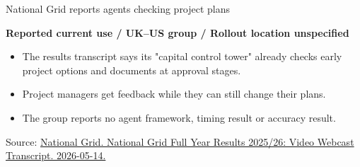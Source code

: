 \begin{frame}[t]{National Grid reports agents checking project plans}
\relax
{\scriptsize\color{Slate}\textbf{Reported current use / UK--US group / Rollout location unspecified}\par}\smallskip
{
\normalsize\begin{itemize}
\item The results transcript says its "capital control tower" already checks early project options and documents at approval stages.
\item Project managers get feedback while they can still change their plans.
\item The group reports no agent framework, timing result or accuracy result.
\end{itemize}\par}
\vfill
{\fontsize{6.3}{7.5}\selectfont\color{Slate} Source: \href{https://www.nationalgrid.com/document/577036/download}{National Grid. National Grid Full Year Results 2025/26: Video Webcast Transcript. 2026-05-14.}\par}
\end{frame}

